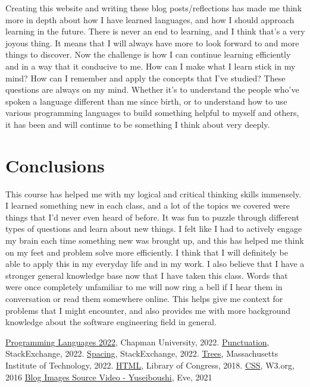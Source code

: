 \documentclass{article}
\theoremstyle{theorem}
\theoremstyle{definition}
\theoremstyle{remark}
\begin{document}
Creating this website and writing these blog posts/reflections has made me think more in depth about how I have learned languages, and how I should approach learning in the future. There is never an end to learning, and I think that’s a very joyous thing. It means that I will always have more to look forward to and more things to discover. Now the challenge is how I can continue learning efficiently and in a way that it conducive to me. How can I make what I learn stick in my mind? How can I remember and apply the concepts that I’ve studied? These questions are always on my mind. Whether it’s to understand the people who’ve spoken a language different than me since birth, or to understand how to use various programming languages to build something helpful to myself and others, it has been and will continue to be something I think about very deeply.

\section{Conclusions}\label{conclusions}

This course has helped me with my logical and critical thinking skills immensely. I learned something new in each class, and a lot of the topics we covered were things that I’d never even heard of before. It was fun to puzzle through different types of questions and learn about new things. I felt like I had to actively engage my brain each time something new was brought up, and this has helped me think on my feet and problem solve more efficiently. I think that I will definitely be able to apply this in my everyday life and in my work. I also believe that I have a stronger general knowledge base now that I have taken this class. Words that were once completely unfamiliar to me will now ring a bell if I hear them in conversation or read them somewhere online. This helps give me context for problems that I might encounter, and also provides me with more background knowledge about the software engineering field in general.


\begin{thebibliography}{99}
 \href{https://github.com/alexhkurz/programming-languages-2022/blob/main/README.md}{Programming Languages 2022}, Chapman University, 2022.
 \href{https://tex.stackexchange.com/questions/2369/why-do-the-less-than-symbol-and-the-greater-than-symbol-appear-wrong-as}{Punctuation}, StackExchange, 2022.
 \href{https://tex.stackexchange.com/questions/14526/spaces-behind-textgreater-not-working-as-expected}{Spacing}, StackExchange, 2022.
 \href{http://sznfong.scripts.mit.edu/site/wp-content/uploads/2018/03/treedrawingtutorialv2.pdf}{Trees}, Massachusetts Institute of Technology, 2022.
\href{https://www.loc.gov/preservation/digital/formats/fdd/fdd000475.shtml}{HTML}, Library of Congress, 2018.
\href{https://www.w3.org/Style/CSS20/history.html}{CSS}, W3.org, 2016
\href{https://www.youtube.com/watch?v=roh_p2l8DHo}{Blog Images Source Video - Yuseiboushi}, Eve, 2021
\end{thebibliography}
\end{document}
